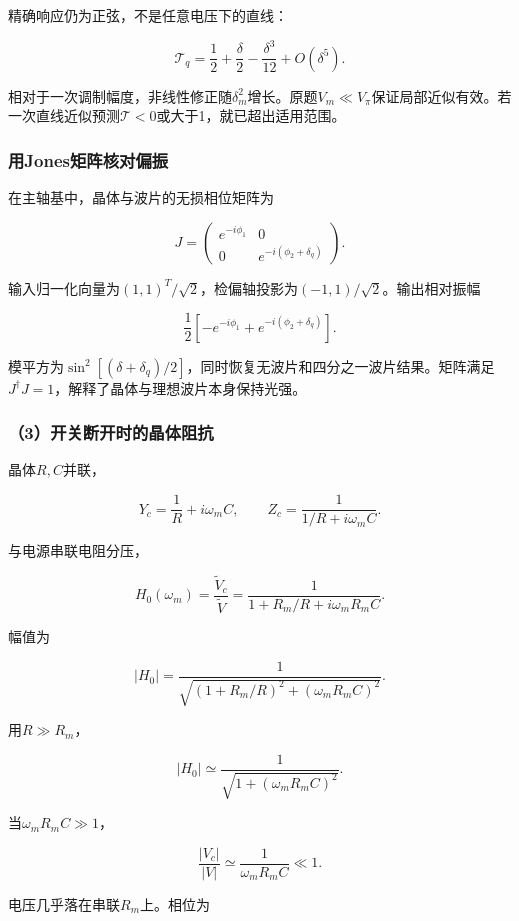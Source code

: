 \documentclass[12pt,a4paper,fontset=fandol]{ctexart}
\begin{document}
精确响应仍为正弦，不是任意电压下的直线：

\[
\mathcal T_q
=\frac12+\frac{\delta}{2}
-\frac{\delta^3}{12}+O(\delta^5).
\]

相对于一次调制幅度，非线性修正随\(\delta_m^2\)增长。原题\(V_m\ll V_\pi\)保证局部近似有效。若一次直线近似预测\(\mathcal T<0\)或大于1，就已超出适用范围。

\subsubsection{用Jones矩阵核对偏振}\label{ux7528jonesux77e9ux9635ux6838ux5bf9ux504fux632f}

在主轴基中，晶体与波片的无损相位矩阵为

\[
J=\begin{pmatrix}
e^{-i\phi_1}&0\\
0&e^{-i(\phi_2+\delta_q)}
\end{pmatrix}.
\]

输入归一化向量为\((1,1)^T/\sqrt2\)，检偏轴投影为\((-1,1)/\sqrt2\)。输出相对振幅

\[
\frac12\left[-e^{-i\phi_1}
+e^{-i(\phi_2+\delta_q)}\right].
\]

模平方为\(\sin^2[(\delta+\delta_q)/2]\)，同时恢复无波片和四分之一波片结果。矩阵满足\(J^\dagger J=1\)，解释了晶体与理想波片本身保持光强。

\subsubsection{（3）开关断开时的晶体阻抗}\label{ux5f00ux5173ux65adux5f00ux65f6ux7684ux6676ux4f53ux963bux6297}

晶体\(R,C\)并联，

\[
Y_c=\frac1R+i\omega_mC,\qquad
Z_c=\frac1{1/R+i\omega_mC}.
\]

与电源串联电阻分压，

\[
\boxed{
H_0(\omega_m)=\frac{\widetilde V_c}{\widetilde V}
=\frac1{1+R_m/R+i\omega_mR_mC}}.
\]

幅值为

\[
\boxed{
|H_0|
=\frac1{\sqrt{(1+R_m/R)^2+(\omega_mR_mC)^2}}}.
\]

用\(R\gg R_m\)，

\[
|H_0|\simeq
\frac1{\sqrt{1+(\omega_mR_mC)^2}}.
\]

当\(\omega_mR_mC\gg1\)，

\[
\boxed{
\frac{|V_c|}{|V|}
\simeq\frac1{\omega_mR_mC}\ll1}.
\]

电压几乎落在串联\(R_m\)上。相位为
\end{document}
